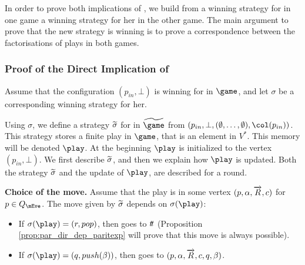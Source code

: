 In order to prove both implications of  , we
build from a winning strategy for \Eve in one game a winning strategy
for her in the other game. The main argument to prove that the new
strategy is winning is to prove a correspondence between the
factorisations of plays in both games.


\subsubsection{Proof of the Direct Implication of }



Assume that the configuration $(p_{in},\bot)$ is winning for \Eve in $\game$,
and let $\sigma$ be a corresponding winning strategy for her.


Using $\sigma$, we define a strategy $\widetilde{\sigma}$ for \Eve in
$\fgame$ from $(p_{in},\bot,(\emptyset,\dots,\emptyset),\pdscol{p_{in}})$.
This strategy stores a finite play in $\game$, that is an element in
$V^*$. This memory will
be denoted $\play$. At the beginning $\play$ is initialized to
the vertex $(p_{in},\bot)$. We first describe $\widetilde{\sigma}$, and then we
explain how $\play$ is updated. Both the strategy $\widetilde{\sigma}$ and the
update of $\play$, are described for a round.

\vspace{0.1cm}
\textbf{Choice of the move. } Assume that the play is in some
vertex $(p,\alpha,\overrightarrow{R},c)$ for $p\in Q_\mEve$. The
move given by $\widetilde{\sigma}$ depends on $\sigma(\play)$:
\begin{itemize}
\item If $\sigma(\play)=(r,pop)$, then \Eve goes to
$t\! t$ (Proposition \ref{prop:par_dir_dep_paritexp} will
  prove that this move is always possible).


\item If $\sigma(\play)=(q,push(\beta))$, then \Eve goes to
$(p,\alpha,\overrightarrow{R},c,q,\beta)$.
\end{itemize}

